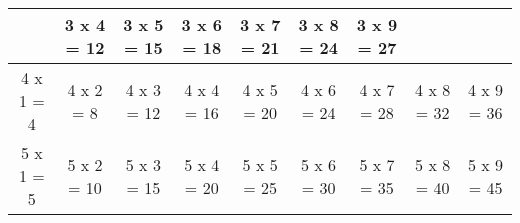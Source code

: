 \documentclass[a4paper,landscape,11pt]{article}
\begin{document}
\begin{tabular}{|c|c|c|c|c|c|c|c|c|}
  &
  
  
  3 x 4 = 12
  
  &
  
  
  3 x 5 = 15
  
  &
  
  
  3 x 6 = 18
  
  &
  
  
  3 x 7 = 21
  
  &
  
  
  3 x 8 = 24
  
  &
  
  
  3 x 9 = 27
  
  
  \\ \hline
  
  
  4 x 1 = 4
  
  &
  
  
  4 x 2 = 8
  
  &
  
  
  4 x 3 = 12
  
  &
  
  
  4 x 4 = 16
  
  &
  
  
  4 x 5 = 20
  
  &
  
  
  4 x 6 = 24
  
  &
  
  
  4 x 7 = 28
  
  &
  
  
  4 x 8 = 32
  
  &
  
  
  4 x 9 = 36
  
  
  \\ \hline
  
  
  5 x 1 = 5
  
  &
  
  
  5 x 2 = 10
  
  &
  
  
  5 x 3 = 15
  
  &
  
  
  5 x 4 = 20
  
  &
  
  
  5 x 5 = 25
  
  &
  
  
  5 x 6 = 30
  
  &
  
  
  5 x 7 = 35
  
  &
  
  
  5 x 8 = 40
  
  &
  
  
  5 x 9 = 45
  

\end{tabular}
\end{document}
